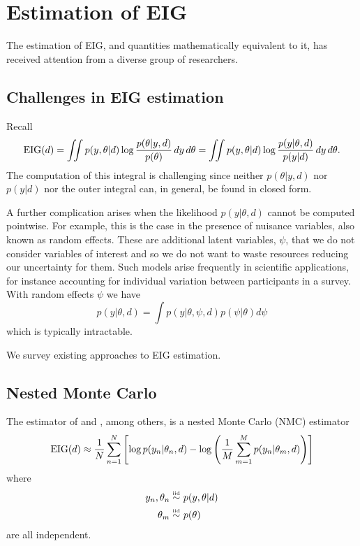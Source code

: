 \section{Estimation of EIG}
The estimation of EIG, and quantities mathematically equivalent to it, has received attention from a diverse group of researchers.

\subsection{Challenges in EIG estimation}
Recall
\begin{align}
	\label{eig:post}
	\text{EIG}(d) =
	\iint  p(y, \theta | d) \log \frac{p(\theta | y, d)}{p(\theta)} \, dy\,  d\theta
	=\iint  p(y, \theta | d) \log \frac{p(y | \theta, d)}{p(y|d)} \, dy\,  d\theta.
\end{align}
The computation of this integral is challenging since neither $p(\theta|y,d)$ nor $p(y|d)$ nor the outer integral can, in general, be found in closed form.

A further complication arises when the likelihood $p(y|\theta,d)$ cannot be computed pointwise. For example, this is the case in the presence of nuisance variables, also known as random effects. 
These are additional latent variables, $\psi$, that we do not consider variables of interest and so we do not want to waste resources reducing our uncertainty for them. 
Such models arise frequently in scientific applications, for instance accounting for individual variation between participants in a survey. With random effects $\psi$ we have
\begin{equation}
	p(y|\theta, d) = \int p(y|\theta, \psi, d) p(\psi | \theta) d\psi
\end{equation}
which is typically intractable.

We survey existing approaches to EIG estimation.

\subsection{Nested Monte Carlo}
The estimator of \cite{vincent2017} and \cite{myung2013}, among others, is a nested Monte Carlo (NMC) estimator
\begin{equation}
	\text{EIG}(d) \approx \frac{1}{N}\sum_{n=1}^N \left[ \log p(y_n | \theta_n, d) - \log \left(\frac{1}{M} \sum_{m=1}^M p(y_n | \theta_m, d) \right) \right]
\end{equation}
where
\begin{align}
	y_n, \theta_n \overset{\text{\tiny iid}}{\sim} & \ p(y, \theta | d) \\
	\theta_m \overset{\text{\tiny iid}}{\sim} & \ p(\theta)
\end{align}
are all independent.


